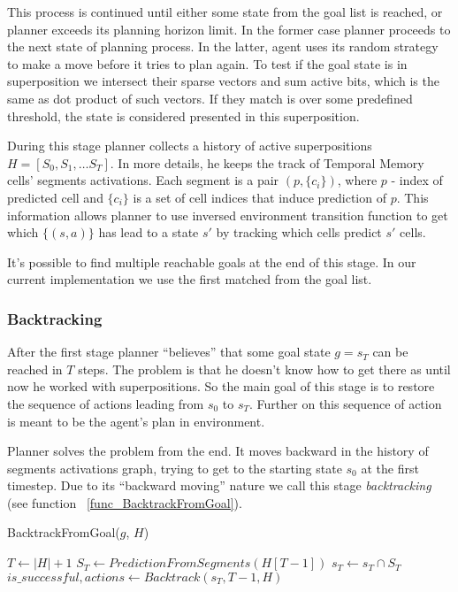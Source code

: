 \documentclass[runningheads]{llncs}
\begin{document}
This process is continued until either some state from the goal list is reached, or planner exceeds its planning horizon limit. In the former case planner proceeds to the next state of planning process. In the latter, agent uses its random strategy to make a move before it tries to plan again. To test if the goal state is in superposition we intersect their sparse vectors and sum active bits, which is the same as dot product of such vectors. If they match is over some predefined threshold, the state is considered presented in this superposition.

During this stage planner collects a history of active superpositions $H = [S_0, S_1, \dots S_T]$. In more details, he keeps the track of Temporal Memory cells' segments activations. Each segment is a pair $(p, \{c_i\})$, where $p$ - index of predicted cell and $\{c_i\}$ is a set of cell indices that induce prediction of $p$. This information allows planner to use inversed environment transition function to get which $\{(s, a)\}$ has lead to a state $s'$ by tracking which cells predict $s'$ cells.

It's possible to find multiple reachable goals at the end of this stage. In our current implementation we use the first matched from the goal list.

\subsubsection{Backtracking}

After the first stage planner ``believes'' that some goal state $g = s_T$ can be reached in $T$ steps. The problem is that he doesn't know how to get there as until now he worked with superpositions. So the main goal of this stage is to restore the sequence of actions leading from $s_0$ to $s_T$. Further on this sequence of action is meant to be the agent's plan in environment.

Planner solves the problem from the end. It moves backward in the history of segments activations graph, trying to get to the starting state $s_0$ at the first timestep. Due to its ``backward moving'' nature we call this stage \textit{backtracking} (see function ~\ref{func_BacktrackFromGoal}).

\begin{function}
  \caption{BacktrackFromGoal($g$, $H$)} \label{func_BacktrackFromGoal}

  $T \leftarrow |H| + 1$ 
  $S_T \leftarrow PredictionFromSegments(H[T-1])$ 
  $s_T \leftarrow s_T \cap S_T$ 
  \quad \\
  $is\_successful, actions \leftarrow Backtrack(s_T, T-1, H)$ \;
\end{function}
\end{document}
